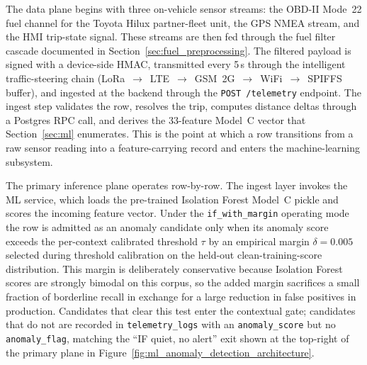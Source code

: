 The data plane begins with three on-vehicle sensor streams: the OBD-II Mode~22 fuel channel for the Toyota Hilux partner-fleet unit, the GPS NMEA stream, and the HMI trip-state signal. These streams are then fed through the fuel filter cascade documented in Section~\ref{sec:fuel_preprocessing}. The filtered payload is signed with a device-side HMAC, transmitted every 5\,s through the intelligent traffic-steering chain (LoRa~$\rightarrow$~LTE~$\rightarrow$~GSM~2G~$\rightarrow$~WiFi~$\rightarrow$~SPIFFS buffer), and ingested at the backend through the \texttt{POST~/telemetry} endpoint. The ingest step validates the row, resolves the trip, computes distance deltas through a Postgres RPC call, and derives the 33-feature Model~C vector that Section~\ref{sec:ml} enumerates. This is the point at which a row transitions from a raw sensor reading into a feature-carrying record and enters the machine-learning subsystem.

The primary inference plane operates row-by-row. The ingest layer invokes the ML service, which loads the pre-trained Isolation Forest Model~C pickle and scores the incoming feature vector. Under the \texttt{if\_with\_margin} operating mode the row is admitted as an anomaly candidate only when its anomaly score exceeds the per-context calibrated threshold $\tau$ by an empirical margin $\delta = 0.005$ selected during threshold calibration on the held-out clean-training-score distribution. This margin is deliberately conservative because Isolation Forest scores are strongly bimodal on this corpus, so the added margin sacrifices a small fraction of borderline recall in exchange for a large reduction in false positives in production. Candidates that clear this test enter the contextual gate; candidates that do not are recorded in \texttt{telemetry\_logs} with an \texttt{anomaly\_score} but no \texttt{anomaly\_flag}, matching the ``IF quiet, no alert'' exit shown at the top-right of the primary plane in Figure~\ref{fig:ml_anomaly_detection_architecture}.

